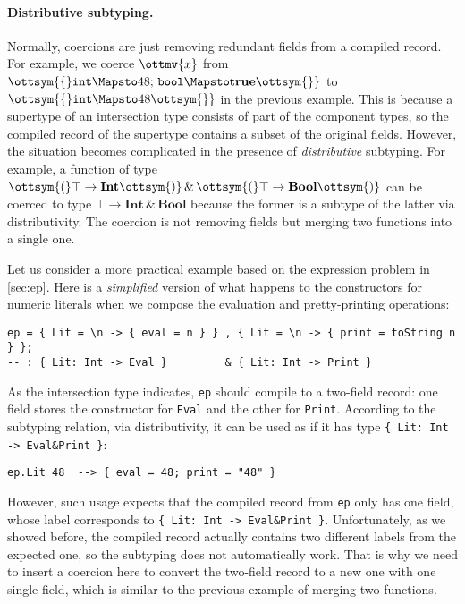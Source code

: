 \paragraph{Distributive subtyping.}
Normally, coercions are just removing redundant fields from a compiled record.
For example, we coerce $\ottmv{x}$ from $\ottsym{\{}   \mathtt{int}   \Mapsto  48  ; \,   \mathtt{bool}   \Mapsto   \mathbf{true}   \ottsym{\}}$ to
$\ottsym{\{}   \mathtt{int}   \Mapsto  48  \ottsym{\}}$ in the previous example. This is because a supertype of an
intersection type consists of part of the component types, so the compiled
record of the supertype contains a subset of the original fields. However, the
situation becomes complicated in the presence of \emph{distributive} subtyping.
For example, a function of type $\ottsym{(}   \top   \rightarrow   \mathbf{Int}   \ottsym{)}  \, {\&} \,  \ottsym{(}   \top   \rightarrow   \mathbf{Bool}   \ottsym{)}$ can be coerced to
type $ \top   \rightarrow   \mathbf{Int}   \, {\&} \,   \mathbf{Bool} $ because the former is a subtype of the latter via
distributivity. The coercion is not removing fields but merging two functions
into a single one.

Let us consider a more practical example based on the expression problem in
\autoref{sec:ep}. Here is a \emph{simplified} version of what happens to the
constructors for numeric literals when we compose the evaluation and
pretty-printing operations:
\begin{lstlisting}
ep = { Lit = \n -> { eval = n } } , { Lit = \n -> { print = toString n } };
-- : { Lit: Int -> Eval }         & { Lit: Int -> Print }
\end{lstlisting}
As the intersection type indicates, \lstinline{ep} should compile to a two-field
record: one field stores the constructor for \lstinline{Eval} and the other for
\lstinline{Print}. According to the subtyping relation, via distributivity, it
can be used as if it has type \lstinline|{ Lit: Int -> Eval&Print }|:
\begin{lstlisting}
ep.Lit 48  --> { eval = 48; print = "48" }
\end{lstlisting}
However, such usage expects that the compiled record from \lstinline{ep} only
has one field, whose label corresponds to \lstinline|{ Lit: Int -> Eval&Print }|.
Unfortunately, as we showed before, the compiled record actually contains two
different labels from the expected one, so the subtyping does not automatically
work. That is why we need to insert a coercion here to convert the two-field
record to a new one with one single field, which is similar to the previous
example of merging two functions.

